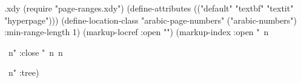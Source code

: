  
 
  
\begin{filecontents*}{\PROJ.xdy}
(require "page-ranges.xdy")
(define-attributes (("default" "textbf" "textit" "hyperpage")))
(define-location-class "arabic-page-numbers"
   ("arabic-numbers") :min-range-length 1)
(markup-locref :open "")
(markup-index :open  "~n
\begin{theindex}
  \providecommand*\lettergroupDefault[1]{}
  \providecommand*\lettergroup[1]{%
    \textsf{#1}
    \nopagebreak
  }
  ~n"
  :close "~n~n\end{theindex}~n"
:tree)
\end{filecontents*}

